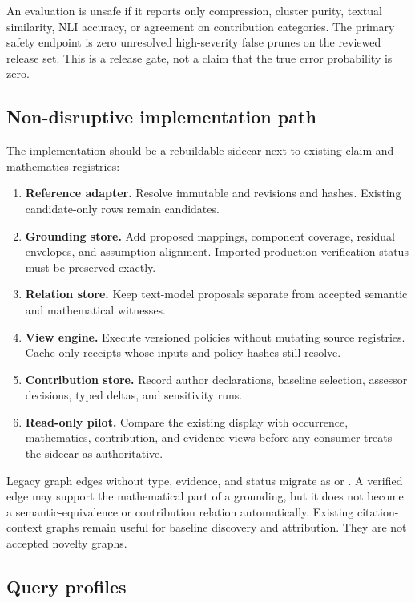 An evaluation is unsafe if it reports only compression, cluster purity, textual similarity, NLI accuracy, or agreement on contribution categories. The primary safety endpoint is zero unresolved high-severity false prunes on the reviewed release set. This is a release gate, not a claim that the true error probability is zero.

\subsection{Non-disruptive implementation path}

The implementation should be a rebuildable sidecar next to existing claim and mathematics registries:
\begin{enumerate}
  \item \textbf{Reference adapter.} Resolve immutable \ScientificClaim{} and \MathClaim{} revisions and hashes. Existing candidate-only rows remain candidates.
  \item \textbf{Grounding store.} Add proposed mappings, component coverage, residual envelopes, and assumption alignment. Imported production verification status must be preserved exactly.
  \item \textbf{Relation store.} Keep text-model proposals separate from accepted semantic and mathematical witnesses.
  \item \textbf{View engine.} Execute versioned policies without mutating source registries. Cache only receipts whose inputs and policy hashes still resolve.
  \item \textbf{Contribution store.} Record author declarations, baseline selection, assessor decisions, typed deltas, and sensitivity runs.
  \item \textbf{Read-only pilot.} Compare the existing display with occurrence, mathematics, contribution, and evidence views before any consumer treats the sidecar as authoritative.
\end{enumerate}

Legacy graph edges without type, evidence, and status migrate as  or . A verified \MathClaim{} edge may support the mathematical part of a grounding, but it does not become a semantic-equivalence or contribution relation automatically. Existing citation-context graphs remain useful for baseline discovery and attribution. They are not accepted novelty graphs.

\subsection{Query profiles}

